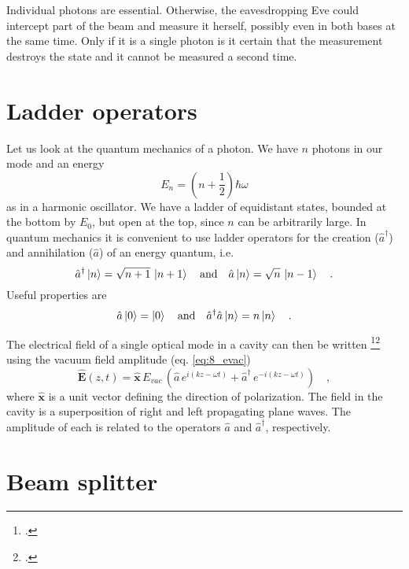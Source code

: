 Individual photons are essential. Otherwise, the eavesdropping Eve could intercept part of the beam and measure it herself, possibly even in both bases at the same time. Only if it is a single photon is it certain that the measurement destroys the state and it cannot be measured a second time.



\section{Ladder operators}


Let us look at the quantum mechanics of a photon. We have $n$ photons in our mode and an energy
\begin{equation}
    E_n = \left( n + \frac{1}{2} \right) \hbar \omega
\end{equation}
as in a harmonic oscillator. We have a ladder of equidistant states, bounded at the bottom by $E_0$, but open at the top, since $n$ can be arbitrarily large. In quantum mechanics it is convenient to use ladder operators for the creation ($\hat{a}^\dagger$) and annihilation ($\hat{a}$) of an energy quantum, i.e.
\begin{equation}
 \hat{a}^\dagger \ket{n} = \sqrt{n+1}\, \ket{n+1}  \quad \text{and} \quad
  \hat{a} \ket{n} = \sqrt{n}\, \ket{n-1} \quad .
\end{equation}
Useful properties are 
\begin{equation}
 \hat{a} \ket{0} = \ket{0}  \quad \text{and} \quad
  \hat{a}^\dagger  \hat{a} \ket{n} = n \ket{n} \quad .
\end{equation}


The electrical field of a single optical mode in a cavity can then be written \footcite[chap. 2.1 and 2.4]{Gerry_Knight_QO}\footcite[chap. 6.1]{Rand2016} using the vacuum field amplitude (eq. \ref{eq:8_evac})
\begin{equation}
\hat{\boldsymbol{E}}(z,t) = \boldsymbol{\hat{x}} \, E_{vac} \, \left(\hat{a} \, e^{i (k z - \omega t)} + \hat{a}^\dagger   \, e^{-i (k z - \omega t)} \right) 
\quad ,
\end{equation}
where $\boldsymbol{\hat{x}}$ is a unit vector defining the direction of polarization. The field in the cavity is a superposition of right and left propagating plane waves. The amplitude of each is related to the operators $\hat{a}$ and $\hat{a}^\dagger$, respectively.


\section{Beam splitter}


